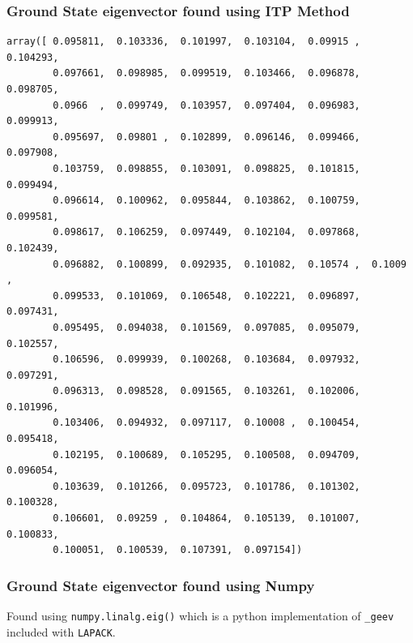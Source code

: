 \pagebreak

\subsubsection{Ground State eigenvector found using ITP
Method}\label{ground-state-eigenvector-found-using-itp-method}

\begin{verbatim}
array([ 0.095811,  0.103336,  0.101997,  0.103104,  0.09915 ,  0.104293,
        0.097661,  0.098985,  0.099519,  0.103466,  0.096878,  0.098705,
        0.0966  ,  0.099749,  0.103957,  0.097404,  0.096983,  0.099913,
        0.095697,  0.09801 ,  0.102899,  0.096146,  0.099466,  0.097908,
        0.103759,  0.098855,  0.103091,  0.098825,  0.101815,  0.099494,
        0.096614,  0.100962,  0.095844,  0.103862,  0.100759,  0.099581,
        0.098617,  0.106259,  0.097449,  0.102104,  0.097868,  0.102439,
        0.096882,  0.100899,  0.092935,  0.101082,  0.10574 ,  0.1009  ,
        0.099533,  0.101069,  0.106548,  0.102221,  0.096897,  0.097431,
        0.095495,  0.094038,  0.101569,  0.097085,  0.095079,  0.102557,
        0.106596,  0.099939,  0.100268,  0.103684,  0.097932,  0.097291,
        0.096313,  0.098528,  0.091565,  0.103261,  0.102006,  0.101996,
        0.103406,  0.094932,  0.097117,  0.10008 ,  0.100454,  0.095418,
        0.102195,  0.100689,  0.105295,  0.100508,  0.094709,  0.096054,
        0.103639,  0.101266,  0.095723,  0.101786,  0.101302,  0.100328,
        0.106601,  0.09259 ,  0.104864,  0.105139,  0.101007,  0.100833,
        0.100051,  0.100539,  0.107391,  0.097154])
\end{verbatim}

\subsubsection{Ground State eigenvector found using
Numpy}\label{ground-state-eigenvector-found-using-numpy}

Found using \texttt{numpy.linalg.eig()} which is a python implementation
of \texttt{\_geev} included with \texttt{LAPACK}.

